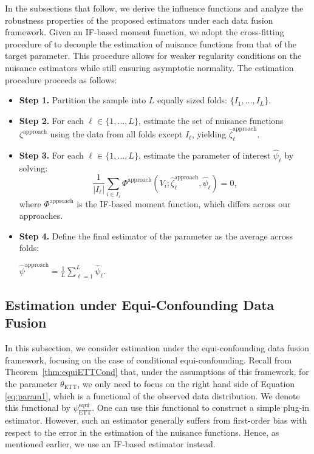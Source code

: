 \documentclass[10pt]{article}
\begin{document}
In the subsections that follow, we derive the influence functions and analyze the robustness properties of the proposed estimators under each data fusion framework. Given an IF-based moment function, we adopt the cross-fitting procedure of \cite{chernozhukov2018double} to decouple the estimation of nuisance functions from that of the target parameter. This procedure allows for weaker regularity conditions on the nuisance estimators while still ensuring asymptotic normality. The estimation procedure proceeds as follows:
\begin{itemize}
\item {\bf Step 1.} Partition the sample into \( L \) equally sized folds: \( \{I_1, \ldots, I_L\} \).
\item {\bf Step 2.} For each \( \ell \in \{1, \ldots, L\} \), estimate the set of nuisance functions \( \zeta^{\text{approach}} \) using the data from all folds except \( I_\ell \), yielding \( \hat\zeta_\ell^{\text{approach}} \).
\item {\bf Step 3.} For each \( \ell \in \{1, \ldots, L\} \), estimate the parameter of interest \( \hat\psi_\ell \) by solving:
\[
\frac{1}{|I_\ell|}\sum_{i \in I_\ell} \Phi^{\text{approach}}(V_i; \hat\zeta_\ell^{\text{approach}}, \hat\psi_\ell) = 0,
\]
where \( \Phi^{\text{approach}} \) is the IF-based moment function, which differs across our approaches.
\item {\bf Step 4.} Define the final estimator of the parameter as the average across folds:
\begin{center}
    $\hat\psi^{\text{approach}} = \frac{1}{L} \sum_{\ell=1}^L \hat\psi_\ell$.
\end{center} 
\end{itemize}

\subsection{Estimation under Equi-Confounding Data Fusion}


In this subsection, we consider estimation under the equi-confounding data fusion framework, focusing on the case of conditional equi-confounding. Recall from Theorem~\ref{thm:equiETTCond} that, under the assumptions of this framework, for the parameter $\theta_{\text{ETT}}$, we only need to focus on the right hand side of Equation \eqref{eq:param1}, which is a functional of the observed data distribution. We denote this functional by $\psi^{\text{equi}}_{\text{ETT}}$. One can use this functional to construct a simple plug-in estimator. However, such an estimator generally suffers from first-order bias with respect to the error in the estimation of the nuisance functions. Hence, as mentioned earlier, we use an IF-based estimator instead.
\end{document}
